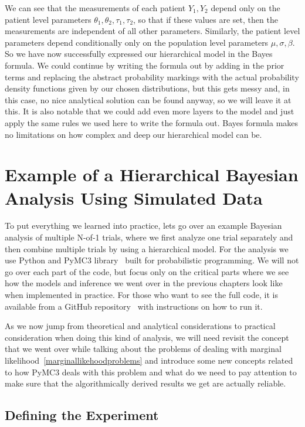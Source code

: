 \documentclass[12pt,a4paper,leqno]{report}
\theoremstyle{plain}
\theoremstyle{definition}
\theoremstyle{remark}
\begin{document}
We can see that the measurements of each patient \(Y_1, Y_2\) depend only on the patient
level parameters \(\theta_1, \theta_2, \tau_1, \tau_2\), so that if these values are set, then the
measurements are independent of all other parameters. Similarly, the patient level parameters depend conditionally only
on the population level parameters \(\mu, \sigma, \beta \). So we have now successfully
expressed our hierarchical model in the Bayes formula. We could continue by writing the
formula out by adding in the prior terms and replacing the abstract probability
markings with the actual probability density functions given by our chosen
distributions, but this gets messy and, in this case, no nice analytical solution can be
found anyway, so we will leave it at this. It is also notable that we could add even
more layers to the model and just apply the same rules we used here to write the formula
out. Bayes formula makes no limitations on how complex and deep our hierarchical model
can be.

\chapter{Example of a Hierarchical Bayesian Analysis Using Simulated
  Data}\label{example}

To put everything we learned into practice, lets go over an example Bayesian
analysis of multiple N-of-1 trials, where we first analyze one trial separately and then
combine multiple trials by using a hierarchical model. For the analysis we use Python and PyMC3 library\ \cite{pymc3} built
for probabilistic programming. We will not go over each part of the code, but focus only
on the critical parts where we see how the models and inference we went over in the
previous chapters look like when implemented in practice. For those who want to see the
full code, it is available from a GitHub repository\ \cite{github} with instructions on how
to run it.

As we now jump from theoretical and analytical considerations to practical consideration
when doing this kind of analysis, we will need revisit the concept that we went over
while talking about the problems of dealing with marginal likelihood\
\ref{marginallikehoodproblems} and introduce some new concepts related to how
PyMC3 deals with this problem and what do we need to pay attention to
make sure that the algorithmically derived results we get are actually reliable.

\section{Defining the Experiment}
\end{document}
